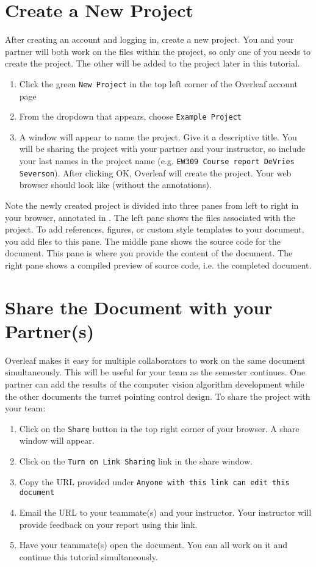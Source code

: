 \documentclass[10pt]{article}
\begin{document}
\section{Create a New Project}
After creating an account and logging in, create a new project. You and your partner will both work on the files within the project, so only one of you needs to create the project. The other will be added to the project later in this tutorial.
\begin{enumerate}
\item Click the green \lstinline{New Project} in the top left corner of the Overleaf account page
\item From the dropdown that appears, choose \lstinline{Example Project}
\item A window will appear to name the project. Give it a descriptive title. You will be sharing the project with your partner and your instructor, so include your last names in the project name (e.g. \lstinline{EW309 Course report DeVries Severson}). After clicking OK, Overleaf will create the project. Your web browser should look like  (without the annotations).
\end{enumerate}

Note the newly created project is divided into three panes from left to right in your browser, annotated in . The left pane shows the files associated with the project. To add references, figures, or custom style templates to your document, you add files to this pane. The middle pane shows the source code for the document. This pane is where you provide the content of the document. The right pane shows a compiled preview of source code, i.e. the completed document.

\section{Share the Document with your Partner(s)}
Overleaf makes it easy for multiple collaborators to work on the same document simultaneously. This will be useful for your team as the semester continues. One partner can add the results of the computer vision algorithm development while the other documents the turret pointing control design. To share the project with your team:
\begin{enumerate}
\item Click on the \lstinline{Share} button in the top right corner of your browser. A share window will appear. 
\item Click on the \lstinline{Turn on Link Sharing} link in the share window.
\item Copy the URL provided under \lstinline{Anyone with this link can edit this document}
\item Email the URL to your teammate(s) and your instructor. Your instructor will provide feedback on your report using this link.
\item Have your teammate(s) open the document. You can all work on it and continue this tutorial simultaneously. 
\end{enumerate}
    
\end{document}
